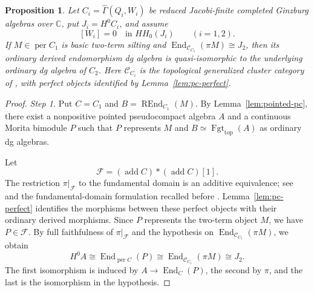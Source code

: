 \documentclass[12pt,a4paper,english,reqno]{amsart}
\theoremstyle{plain}
\newtheorem{prp}[thm]{Proposition}
\theoremstyle{definition}
\numberwithin{equation}{section}
\newcommand{\lemref}[1]{Lemma~\ref{#1}}
\def\Ga{\Gamma}
\def\End{\operatorname{End}}
\def\add{\operatorname{add}}
\def\perf{\operatorname{per}}
\def\calC{{\mathcal C}}
\def\bbC{{\mathbb C}}
\def\iso{\cong}
\newcommand{\Fgt}{\operatorname{Fgt}}
\def\REnd{\operatorname{REnd}}
\begin{document}
\begin{prp}\label{prop:zero-class-recognition}
Let $C_i=\widehat\Ga(Q_i,W_i)$ be reduced Jacobi-finite completed Ginzburg algebras over $\bbC$, put $J_i=H^0C_i$, and assume
\[
 [W_i]=0\quad\text{in }HH_0(J_i)\qquad(i=1,2).
\]
If $M\in\perf C_1$ is basic two-term silting and
$\End_{\calC_{C_1}}(\pi M)\iso J_2$, then its ordinary derived endomorphism dg algebra is quasi-isomorphic to the underlying ordinary dg algebra of $C_2$.
Here $\calC_{C_i}$ is the topological generalized cluster category of \cite[Section 4]{HK}, with perfect objects identified by \lemref{lem:pc-perfect}.
\end{prp}
\begin{proof}
\noindent\emph{Step 1.}
Put $C=C_1$ and $B=\REnd_{C_1}(M)$. By \lemref{lem:pointed-pc}, there exist a nonpositive pointed pseudocompact algebra $A$ and a continuous Morita bimodule $P$ such that $P$ represents $M$ and $B\simeq\Fgt_{\mathrm{top}}(A)$ as ordinary dg algebras.

Let
\[
 \mathcal F=(\add C)*(\add C)[1].
\]
The restriction $\pi|_{\mathcal F}$ to the fundamental domain is an additive equivalence; see \cite[Proposition 4.2]{KY} and the fundamental-domain formulation recalled before \cite[Definition 5.1]{HI}. \lemref{lem:pc-perfect} identifies the morphisms between these perfect objects with their ordinary derived morphisms. Since $P$ represents the two-term object $M$, we have $P\in\mathcal F$. By full faithfulness of $\pi|_{\mathcal F}$ and the hypothesis on $\End_{\calC_{C_1}}(\pi M)$, we obtain
\[
 H^0A\iso\End_{\perf C}(P)
 \iso\End_{\calC_{C_1}}(\pi M)
 \iso J_2.
\]
The first isomorphism is induced by $A\to\End_C(P)$, the second by $\pi$, and the last is the isomorphism in the hypothesis.


\end{proof}
\end{document}
